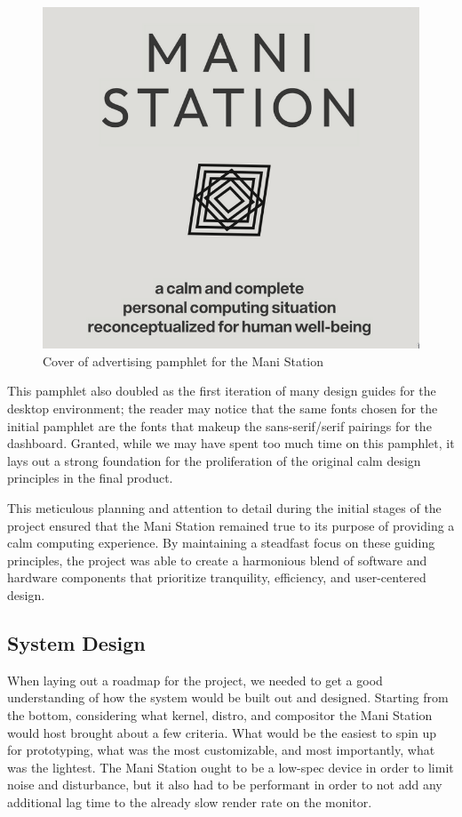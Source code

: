 \documentclass[letterpaper,twocolumn,10pt]{article}
\begin{document}
\begin{figure}[h!]
    \centering
    \includegraphics[scale=0.25]{res/pamphlet.png}
    \caption{Cover of advertising pamphlet for the Mani Station}
\end{figure}

This pamphlet also doubled as the first iteration of many design guides for the desktop environment; the reader may notice that the same fonts chosen for the initial pamphlet are the fonts that makeup the sans-serif/serif pairings for the dashboard. Granted, while we may have spent too much time on this pamphlet, it lays out a strong foundation for the proliferation of the original calm design principles in the final product.

This meticulous planning and attention to detail during the initial stages of the project ensured that the Mani Station remained true to its purpose of providing a calm computing experience. By maintaining a steadfast focus on these guiding principles, the project was able to create a harmonious blend of software and hardware components that prioritize tranquility, efficiency, and user-centered design.

\subsection{System Design}

When laying out a roadmap for the project, we needed to get a good understanding of how the system would be built out and designed. Starting from the bottom, considering what kernel, distro, and compositor the Mani Station would host brought about a few criteria. What would be the easiest to spin up for prototyping, what was the most customizable, and most importantly, what was the lightest. The Mani Station ought to be a low-spec device in order to limit noise and disturbance, but it also had to be performant in order to not add any additional lag time to the already slow render rate on the monitor.
\end{document}
